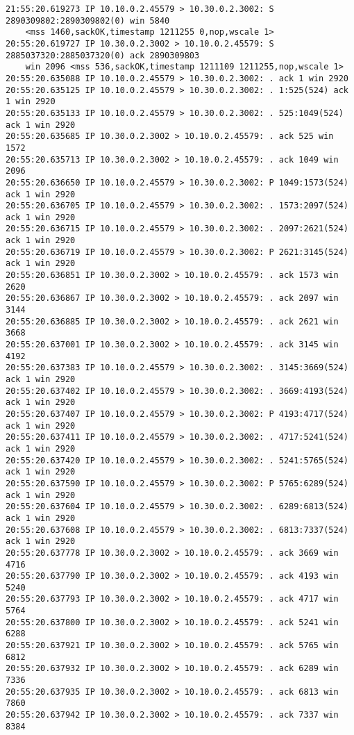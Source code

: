 \documentclass[a4paper,12pt]{article}
\begin{document}
\begin{Verbatim}
21:55:20.619273 IP 10.10.0.2.45579 > 10.30.0.2.3002: S 2890309802:2890309802(0) win 5840 
	<mss 1460,sackOK,timestamp 1211255 0,nop,wscale 1>
20:55:20.619727 IP 10.30.0.2.3002 > 10.10.0.2.45579: S 2885037320:2885037320(0) ack 2890309803 
	win 2096 <mss 536,sackOK,timestamp 1211109 1211255,nop,wscale 1>
20:55:20.635088 IP 10.10.0.2.45579 > 10.30.0.2.3002: . ack 1 win 2920 
20:55:20.635125 IP 10.10.0.2.45579 > 10.30.0.2.3002: . 1:525(524) ack 1 win 2920 
20:55:20.635133 IP 10.10.0.2.45579 > 10.30.0.2.3002: . 525:1049(524) ack 1 win 2920 
20:55:20.635685 IP 10.30.0.2.3002 > 10.10.0.2.45579: . ack 525 win 1572 
20:55:20.635713 IP 10.30.0.2.3002 > 10.10.0.2.45579: . ack 1049 win 2096 
20:55:20.636650 IP 10.10.0.2.45579 > 10.30.0.2.3002: P 1049:1573(524) ack 1 win 2920 
20:55:20.636705 IP 10.10.0.2.45579 > 10.30.0.2.3002: . 1573:2097(524) ack 1 win 2920 
20:55:20.636715 IP 10.10.0.2.45579 > 10.30.0.2.3002: . 2097:2621(524) ack 1 win 2920 
20:55:20.636719 IP 10.10.0.2.45579 > 10.30.0.2.3002: P 2621:3145(524) ack 1 win 2920 
20:55:20.636851 IP 10.30.0.2.3002 > 10.10.0.2.45579: . ack 1573 win 2620 
20:55:20.636867 IP 10.30.0.2.3002 > 10.10.0.2.45579: . ack 2097 win 3144 
20:55:20.636885 IP 10.30.0.2.3002 > 10.10.0.2.45579: . ack 2621 win 3668 
20:55:20.637001 IP 10.30.0.2.3002 > 10.10.0.2.45579: . ack 3145 win 4192 
20:55:20.637383 IP 10.10.0.2.45579 > 10.30.0.2.3002: . 3145:3669(524) ack 1 win 2920 
20:55:20.637402 IP 10.10.0.2.45579 > 10.30.0.2.3002: . 3669:4193(524) ack 1 win 2920 
20:55:20.637407 IP 10.10.0.2.45579 > 10.30.0.2.3002: P 4193:4717(524) ack 1 win 2920 
20:55:20.637411 IP 10.10.0.2.45579 > 10.30.0.2.3002: . 4717:5241(524) ack 1 win 2920 
20:55:20.637420 IP 10.10.0.2.45579 > 10.30.0.2.3002: . 5241:5765(524) ack 1 win 2920 
20:55:20.637590 IP 10.10.0.2.45579 > 10.30.0.2.3002: P 5765:6289(524) ack 1 win 2920 
20:55:20.637604 IP 10.10.0.2.45579 > 10.30.0.2.3002: . 6289:6813(524) ack 1 win 2920 
20:55:20.637608 IP 10.10.0.2.45579 > 10.30.0.2.3002: . 6813:7337(524) ack 1 win 2920 
20:55:20.637778 IP 10.30.0.2.3002 > 10.10.0.2.45579: . ack 3669 win 4716 
20:55:20.637790 IP 10.30.0.2.3002 > 10.10.0.2.45579: . ack 4193 win 5240 
20:55:20.637793 IP 10.30.0.2.3002 > 10.10.0.2.45579: . ack 4717 win 5764 
20:55:20.637800 IP 10.30.0.2.3002 > 10.10.0.2.45579: . ack 5241 win 6288 
20:55:20.637921 IP 10.30.0.2.3002 > 10.10.0.2.45579: . ack 5765 win 6812 
20:55:20.637932 IP 10.30.0.2.3002 > 10.10.0.2.45579: . ack 6289 win 7336 
20:55:20.637935 IP 10.30.0.2.3002 > 10.10.0.2.45579: . ack 6813 win 7860 
20:55:20.637942 IP 10.30.0.2.3002 > 10.10.0.2.45579: . ack 7337 win 8384 

\end{Verbatim}
\end{document}
